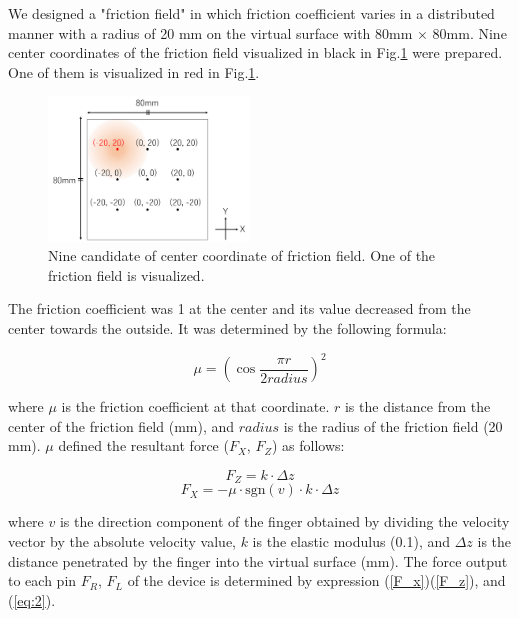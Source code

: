 We designed a "friction field" in which friction coefficient varies in a distributed manner with a radius of 20 mm on the virtual surface with 80mm $\times$ 80mm.
Nine center coordinates of the friction field visualized in black in Fig.\ref{fig_friction_position} were prepared. 
One of them is visualized in red in Fig.\ref{fig_friction_position}. 

\begin{figure}[h]
  \centering
  \includegraphics[width=2.1in]{images/fig_friction_field}
  \caption{Nine candidate of center coordinate of friction field. One of the friction field is visualized.}
  \label{fig_friction_position}
\end{figure}

The friction coefficient was 1 at the center and its value decreased from the center towards the outside. 
It was determined by the following formula:

\begin{equation}
    \mu = (\cos{\frac{\pi r}{2 radius}})^2
\end{equation}

where $\mu$ is the friction coefficient at that coordinate. 
$r$ is the distance from the center of the friction field (mm), and $radius$  is the radius of the friction field (20 mm).
$\mu$ defined the resultant force ($F_{X}$, $F_{Z}$) as follows:

\begin{equation}
\label{F_z}
    F_{Z} = k \cdot \Delta z 
\end{equation}
\begin{equation}
\label{F_x}
    F_{X} = - \mu \cdot \mathrm{sgn}(v) \cdot k \cdot \Delta z
\end{equation}

where $v$  is the direction component of the finger obtained by dividing the velocity vector by the absolute velocity value, $k$ is the elastic modulus (0.1), and $\Delta z$ is the distance penetrated by the finger into the virtual surface (mm). 
The force output to each pin $F_{R}$, $F_{L}$ of the device is determined by expression (\ref{F_x})(\ref{F_z}), and (\ref{eq:2}).

